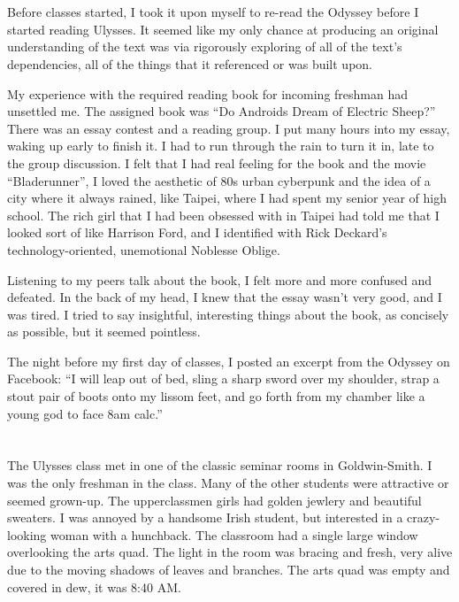 \section{}

Before classes started, I took it upon myself to re-read the Odyssey before I
started reading Ulysses.  It seemed like my only chance at producing an original
understanding of the text was via rigorously exploring of all of the text's
dependencies, all of the things that it referenced or was built upon. 

My experience with the required reading book for incoming freshman had unsettled
me.  The assigned book was ``Do Androids Dream of Electric Sheep?''  There was
an essay contest and a reading group.  I put many hours into my essay, waking up
early to finish it.  I  had to run through the rain to turn it in, late to the
group discussion.  I felt that I had real feeling for the book and the movie
``Bladerunner'', I loved the aesthetic of 80s urban cyberpunk and the idea of a
city where it always rained, like Taipei, where I had spent my senior year of
high school.  The rich girl that I had been obsessed with in Taipei had told me
that I looked sort of like Harrison Ford, and I identified with Rick Deckard's
technology-oriented, unemotional Noblesse Oblige. 

Listening to my peers talk about the book, I felt more and more confused and
defeated.  In the back of my head, I knew that the essay wasn't very good, and I
was tired.  I tried to say insightful, interesting things about the book, as
concisely as possible, but it seemed pointless.

The night before my first day of classes, I posted an excerpt from the Odyssey
on Facebook: ``I will leap out of bed, sling a sharp sword over my shoulder,
strap a stout pair of boots onto my lissom feet, and go forth from my chamber
like a young god to face 8am calc.''

\section{}

The Ulysses class met in one of the classic seminar rooms in Goldwin-Smith.  I
was the only freshman in the class.  Many of the other students were attractive
or seemed grown-up.  The upperclassmen girls had golden jewlery and beautiful
sweaters.  I was annoyed by a handsome Irish student, but interested in a
crazy-looking woman with a hunchback.  The classroom had a single large window
overlooking the arts quad.  The light in the room was bracing and fresh, very
alive due to the moving shadows of leaves and branches.  The arts quad was empty
and covered in dew, it was 8:40 AM.

